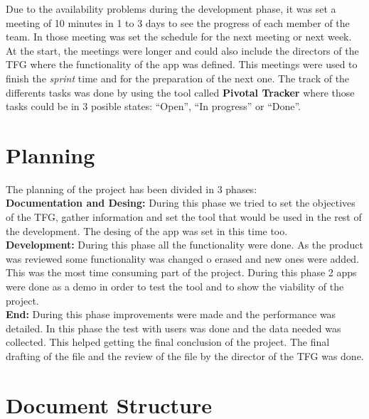 Due to the availability problems during the development phase, it was set a meeting of 10 minutes in 1 to 3 days to see the progress of each member of the team. In those meeting was set the schedule for the next meeting or next week. At the start, the meetings were longer and could also include the directors of the TFG where the functionality of the app was defined. This meetings were used to finish the \textit{sprint} time and for the preparation of the next one. The track of the differents tasks was done by using the tool called \textbf{Pivotal Tracker} where those tasks could be in 3 posible states: ``Open'', ``In progress'' or ``Done''.\\

\section*{Planning}



The planning of the project has been divided in 3 phases:\\

\textbf{Documentation and Desing:} During this phase we tried to set the objectives of the TFG, gather information and set the tool that would be used in the rest of the development. The desing of the app was set in this time too.\\

\textbf{Development:} During this phase all the functionality were done. As the product was reviewed some functionality was changed o erased and new ones were added. This was the most time consuming part of the project. During this phase 2 apps were done as a demo in order to test the tool and to show the viability of the project.\\

\textbf{End:} During this phase improvements were made and the performance was detailed. In this phase the test with users was done and the data needed was collected. This helped getting the final conclusion of the project. The final drafting of the file and the review of the file by the director of the TFG was done.\\

\section*{Document Structure}


